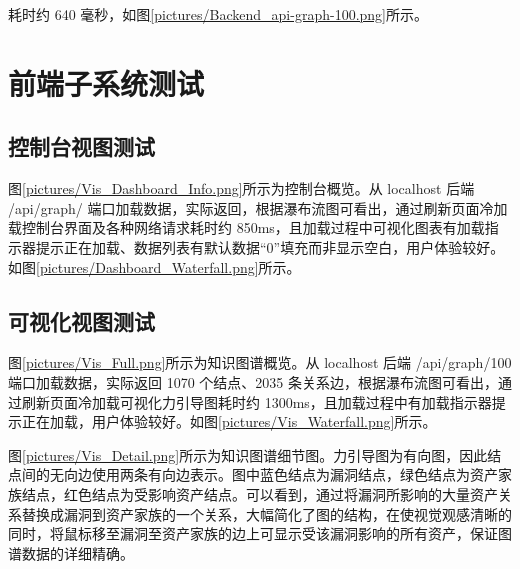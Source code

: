 \documentclass[a4paper,AutoFakeBold,oneside,12pt]{book}
\begin{document}

耗时约 640 毫秒，如图\ref{pictures/Backend_api-graph-100.png}所示。


\section{前端子系统测试}

\subsection{控制台视图测试\label{控制台视图测试}}

图\ref{pictures/Vis_Dashboard_Info.png}所示为控制台概览。从 localhost 后端 /api/graph/ 端口加载数据，实际返回，根据瀑布流图可看出，通过刷新页面冷加载控制台界面及各种网络请求耗时约 850ms，且加载过程中可视化图表有加载指示器提示正在加载、数据列表有默认数据“0”填充而非显示空白，用户体验较好。如图\ref{pictures/Dashboard_Waterfall.png}所示。



\subsection{可视化视图测试\label{可视化视图测试}}

图\ref{pictures/Vis_Full.png}所示为知识图谱概览。从 localhost 后端 /api/graph/100 端口加载数据，实际返回 1070 个结点、2035 条关系边，根据瀑布流图可看出，通过刷新页面冷加载可视化力引导图耗时约 1300ms，且加载过程中有加载指示器提示正在加载，用户体验较好。如图\ref{pictures/Vis_Waterfall.png}所示。



图\ref{pictures/Vis_Detail.png}所示为知识图谱细节图。力引导图为有向图，因此结点间的无向边使用两条有向边表示。图中蓝色结点为漏洞结点，绿色结点为资产家族结点，红色结点为受影响资产结点。可以看到，通过将漏洞所影响的大量资产关系替换成漏洞到资产家族的一个关系，大幅简化了图的结构，在使视觉观感清晰的同时，将鼠标移至漏洞至资产家族的边上可显示受该漏洞影响的所有资产，保证图谱数据的详细精确。
\end{document}

